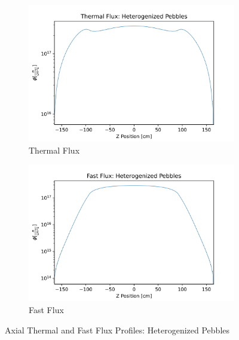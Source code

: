 \begin{figure}[h!]
\centering

\begin{subfigure}{0.45\textwidth}
  \includegraphics[width=0.95\linewidth]{figures/therm_flux_het_z.png}
  \caption{Thermal Flux}
  \label{fig:het-det-z-therm}
\end{subfigure}%
%
\begin{subfigure}{0.45\textwidth}
  \includegraphics[width=0.95\linewidth]{figures/fast_flux_het_z.png}
  \caption{Fast Flux}
  \label{fig:het-det-z-fast}
\end{subfigure}

%
\caption{Axial Thermal and Fast Flux Profiles: Heterogenized Pebbles}
\label{fig:het-det-z}
\end{figure}
